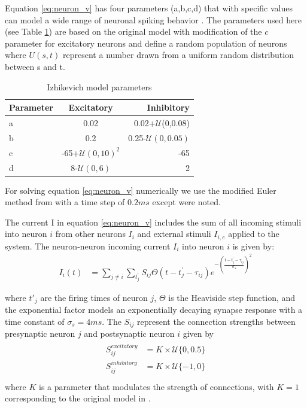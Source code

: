 Equation \ref{eq:neuron_v} has four parameters (a,b,c,d) that with specific values can model a wide range of neuronal spiking behavior \citep{izhikevich2003}. 
The parameters used here (see Table \ref{tab:izzy_params}) are based on the original model with modification of the $c$ parameter for excitatory neurons and define a random population of neurons where $U(s,t)$ represent a number drawn from a uniform random distribution between s and t. 
\begin{table}[!htb]
 \caption{Izhikevich model parameters}
 \label{tab:izzy_params}
 \centering
 \begin{tabular}{lcr}
  \textbf{Parameter} & \textbf{Excitatory} & \textbf{Inhibitory} \\
  \hline
  a & 0.02 & 0.02+$\mathcal{U}$(0,0.08) \\
  b & 0.2 & 0.25-$\mathcal{U}(0,0.05)$\\
  c & -65+$\mathcal{U}(0,10)^2$ & -65 \\
  d & 8-$\mathcal{U}(0,6)$& 2 \\
 \end{tabular}
\end{table}
For solving equation \ref{eq:neuron_v} numerically we use the modified Euler method from \citet{izhikevich2003} with a time step of $0.2 ms$ except were noted. 

The current I in equation \ref{eq:neuron_v} includes the sum of all incoming stimuli into neuron $i$ from other neurons $I_i$ and external stimuli $I_{i,e}$ applied to the system. 
The neuron-neuron incoming current $I_i$ into neuron $i$ is given by:
\begin{align}
 I_i(t) &= \sum_{j\ne i} \sum_{t^\prime_j} S_{ij}  \Theta(t-t^\prime_j-\tau_{ij})e^{-(\frac{t-t^\prime_j-\tau_{ij}}{\sigma_s})^2}
\end{align}

where $t'_j$ are the firing times of neuron $j$, $\Theta$ is the Heaviside step function, and the exponential factor models an exponentially decaying synapse response with a time constant of $\sigma_s = 4 ms$. 
The $S_{ij}$ represent the connection strengths between presynaptic neuron $j$ and postsynaptic neuron $i$ given by
\begin{align}
 \begin{split}
  S_{ij}^{excitatory} &= K \times \mathcal{U}\{0,0.5 \} \\
  S_{ij}^{inhibitory} &= K \times \mathcal{U}\{-1,0 \}  \\
 \end{split}
\end{align}
where $K$ is a parameter that modulates the strength of connections, with $K=1$ corresponding to the original model in \citet{izhikevich2003}. 

